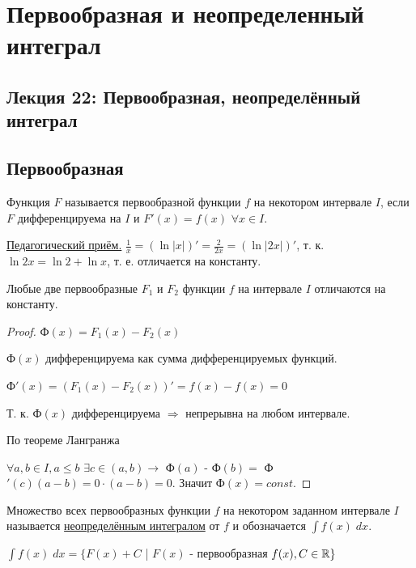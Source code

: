 	\chapter{Первообразная и неопределенный интеграл}
	
	\section*{Лекция 22: Первообразная, неопределённый интеграл}
	
	\section{Первообразная}
	
	\begin{definition}
		Функция $F$ называется первообразной функции $f$ на некотором интервале $I$, если $F$ дифференцируема на $I$ и $F'(x) = f(x)$ $\forall x \in I$.
	\end{definition}
	
	\underline{Педагогический приём.}
	$\frac{1}{x} = (\ln{|x|})' = \frac{2}{2x} = (\ln{|2x|})'$, т. к. $\ln{2x} = \ln{2} + \ln{x}$, т. е. отличается на константу.
	
	\begin{lemma}
		Любые две первообразные $F_1$ и $F_2$ функции $f$ на интервале $I$ отличаются на константу.
	\end{lemma}
	
	\begin{proof}
		Ф$(x) = F_1(x) - F_2(x)$
		
		Ф$(x)$ дифференцируема как сумма дифференцируемых функций.
		
		Ф$'(x) = (F_1(x) - F_2(x))' = f(x) - f(x) = 0$
		
		Т. к. Ф$(x)$ дифференцируема $\Rightarrow$ непрерывна на любом интервале.
		
		По теореме Лангранжа 
		
		$\forall a, b \in I, a \leqslant b$ $\exists c \in (a, b) \rightarrow$ Ф$(a)$ - Ф$(b) = $ Ф$'(c)(a - b) = 0 \cdot (a - b) = 0.$ Значит Ф$(x) = const$.
	\end{proof}
	
	\begin{definition}
		Множество всех первообразных функции $f$ на некотором заданном интервале $I$ называется \underline{неопределённым интегралом} от $f$ и обозначается $\displaystyle\int f(x) \; dx$.
	\end{definition}
	
	$\displaystyle\int f(x) \; dx = \{F(x) + C$ | $F(x)$ - первообразная $f(x), C \in \mathbb R\}$
	
